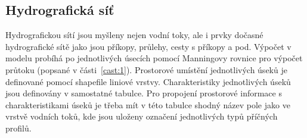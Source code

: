 









% 
% 
% 
% 
% 







\subsection{Hydrografická síť} \label{sec:vodnitoky}

Hydrografickou sítí jsou myšleny nejen vodní toky, ale i prvky dočasné hydrografické sítě jako jsou příkopy, průlehy, cesty s příkopy a pod. Výpočet v modelu probíhá po jednotlivých úsecích pomocí Manningovy rovnice pro výpočet průtoku (popsané v části~\ref{cast:1}). Prostorové umístění jednotlivých úseků je definované pomocí shapefile liniové vrstvy. Charakteristiky jednotlivých úseků jsou definovány v samostatné tabulce. Pro propojení prostorové informace s charakteristikami úseků je třeba mít v této tabulce shodný název pole jako ve vrstvě vodních toků, kde jsou uloženy označení jednotlivých typů příčných profilů.

